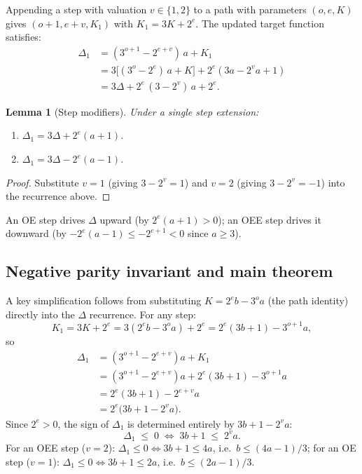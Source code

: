 \documentclass[11pt]{article}
\newtheorem{lemma}{Lemma}[section]
\begin{document}
Appending a step with valuation $v \in \{1,2\}$ to a path with parameters
$(o, e, K)$ gives $(o+1, e+v, K_1)$ with $K_1 = 3K + 2^e$.  The updated
target function satisfies:
\begin{align*}
  \Delta_1 &= (3^{o+1} - 2^{e+v})\,a + K_1 \\
           &= 3\bigl[(3^o - 2^e)\,a + K\bigr] + 2^e(3a - 2^v a + 1) \\
           &= 3\Delta + 2^e\,(3 - 2^v)\,a + 2^e.
\end{align*}

\begin{lemma}[Step modifiers]
\label{lem:step}
Under a single step extension:
\begin{enumerate}
  \item[\textup{(OE)}] $\Delta_1 = 3\Delta + 2^e(a+1)$.
  \item[\textup{(OEE)}] $\Delta_1 = 3\Delta - 2^e(a-1)$.
\end{enumerate}
\end{lemma}
\begin{proof}
Substitute $v = 1$ (giving $3 - 2^v = 1$) and $v = 2$ (giving $3 - 2^v = -1$)
into the recurrence above.
\end{proof}

An OE step drives $\Delta$ upward (by $2^e(a+1) > 0$); an OEE step drives it
downward (by $-2^e(a-1) \leq -2^{e+1} < 0$ since $a \geq 3$).

\subsection{Negative parity invariant and main theorem}

A key simplification follows from substituting $K = 2^e b - 3^o a$ (the
path identity) directly into the $\Delta$ recurrence.  For any step:
\[
  K_1 = 3K + 2^e = 3(2^e b - 3^o a) + 2^e = 2^e(3b+1) - 3^{o+1}a,
\]
so
\begin{align*}
  \Delta_1 &= (3^{o+1} - 2^{e+v})a + K_1 \\
           &= (3^{o+1} - 2^{e+v})a + 2^e(3b+1) - 3^{o+1}a \\
           &= 2^e(3b+1) - 2^{e+v}a \\
           &= 2^e\bigl(3b + 1 - 2^v a\bigr).
\end{align*}
Since $2^e > 0$, the sign of $\Delta_1$ is determined entirely by
$3b + 1 - 2^v a$:
\begin{equation}
  \Delta_1 \;\leq\; 0 \;\iff\; 3b + 1 \;\leq\; 2^v a.
  \tag{$\dagger$}\label{eq:delta1}
\end{equation}
For an OEE step ($v = 2$): $\Delta_1 \leq 0 \iff 3b+1 \leq 4a$, i.e.\
$b \leq (4a-1)/3$; for an OE step ($v = 1$): $\Delta_1 \leq 0 \iff
3b+1 \leq 2a$, i.e.\ $b \leq (2a-1)/3$.
\end{document}

